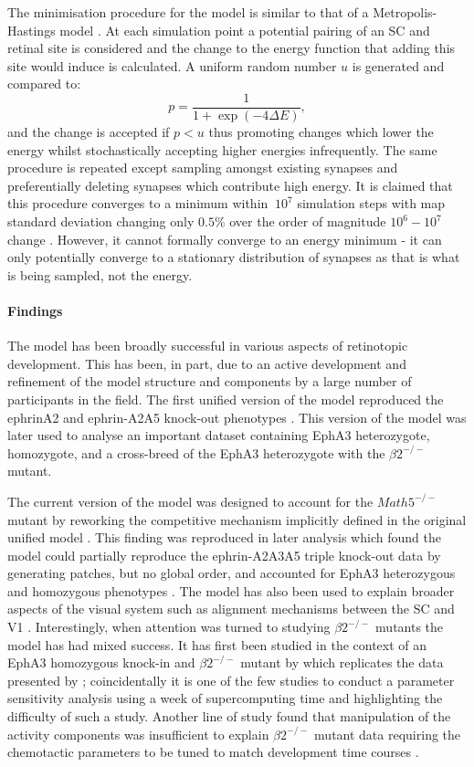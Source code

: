 The minimisation procedure for the model is similar to that of a Metropolis-Hastings model \cite{Gelman1995-uj}. At each simulation point a potential pairing of an SC and retinal site is considered and the change to the energy function that adding this site would induce is calculated. A uniform random number $u$ is generated and compared to:
\begin{equation}
p = \frac{1}{1+\exp(-4\Delta E)},
\end{equation}
and the change is accepted if $p<u$ thus promoting changes which lower the energy whilst stochastically accepting higher energies infrequently. The same procedure is repeated except sampling amongst existing synapses and preferentially deleting synapses which contribute high energy. It is claimed that this procedure converges to a minimum within $~10^7$ simulation steps with map standard deviation changing only $0.5\%$ over the order of magnitude $10^6-10^7$ change \cite{Tsigankov2006-uy}. However, it cannot formally converge to an energy minimum - it can only potentially converge to a stationary distribution of synapses as that is what is being sampled, not the energy.
\paragraph{Findings}
The model has been broadly successful in various aspects of retinotopic development. This has been, in part, due to an active development and refinement of the model structure and components by a large number of participants in the field. The first unified version of the model reproduced the ephrinA2 and ephrin-A2A5 knock-out phenotypes \cite{Tsigankov2006-uy}. This version of the model was later used to analyse an important dataset containing EphA3 heterozygote, homozygote, and a cross-breed of the EphA3 heterozygote with the $\beta2^{-/-}$ mutant.

The current version of the model was designed to account for the $Math5^{-/-}$ mutant by reworking the competitive mechanism implicitly defined in the original unified model \cite{Triplett2011-jk, Tsigankov2006-uy}. This finding was reproduced in later analysis which found the model could partially reproduce the ephrin-A2A3A5 triple knock-out data by generating patches, but no global order, and accounted for EphA3 heterozygous and homozygous phenotypes \cite{Hjorth2015-le}. The model has also been used to explain broader aspects of the visual system such as alignment mechanisms between the SC and V1  \cite{Savier2017-wt}. Interestingly, when attention was turned to studying $\beta2^{-/-}$ mutants the model has had mixed success. It has first been studied in the context of an EphA3 homozygous knock-in and $\beta2^{-/-}$ mutant by \cite{Tikidji-Hamburyan2016-sn} which replicates the data presented by \cite{Triplett2012-ap}; coincidentally it is one of the few studies to conduct a parameter sensitivity analysis using a week of supercomputing time and highlighting the difficulty of such a study. Another line of study found that manipulation of the activity components was insufficient to explain $\beta2^{-/-}$ mutant data requiring the chemotactic parameters to be tuned to match development time courses \cite{Lyngholm2019-fs}. 
